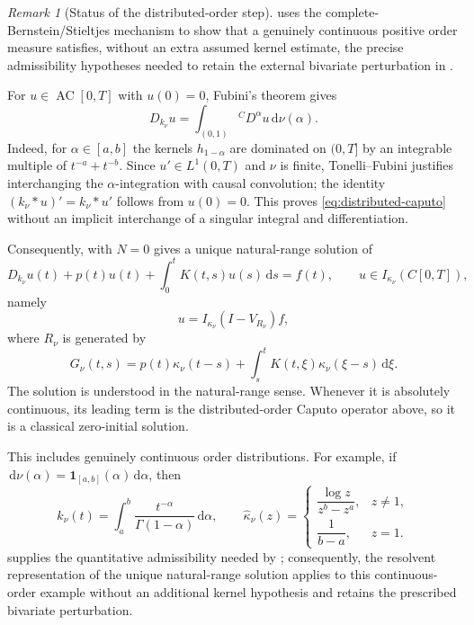 \documentclass[11pt]{article}
\numberwithin{equation}{section}
\theoremstyle{definition}
\theoremstyle{remark}
\newtheorem{remark}{Remark}
\newcommand{\one}{\mathbf 1}
\newcommand{\dd}{\,\mathrm d}
\newcommand{\AC}{\operatorname{AC}}
\begin{document}
\begin{remark}[Status of the distributed-order step]
 uses the complete-Bernstein/Stieltjes mechanism to show that a genuinely continuous positive order measure satisfies, without an extra assumed kernel estimate, the precise admissibility hypotheses needed to retain the external bivariate perturbation in .
\end{remark}

For $u\in\AC[0,T]$ with $u(0)=0$, Fubini's theorem gives
\begin{equation}
D_{k_\nu}u=\int_{(0,1)}{}^{C}\!D^\alpha u\dd\nu(\alpha).
\label{eq:distributed-caputo}
\end{equation}
Indeed, for $\alpha\in[a,b]$ the kernels $h_{1-\alpha}$ are dominated on $(0,T]$ by an integrable multiple of $t^{-a}+t^{-b}$. Since $u'\in L^1(0,T)$ and $\nu$ is finite, Tonelli--Fubini justifies interchanging the $\alpha$-integration with causal convolution; the identity $(k_\nu*u)'=k_\nu*u'$ follows from $u(0)=0$. This proves \eqref{eq:distributed-caputo} without an implicit interchange of a singular integral and differentiation.

Consequently,  with $N=0$ gives a unique natural-range solution of
\begin{equation}
D_{k_\nu}u(t)+p(t)u(t)+\int_0^tK(t,s)u(s)\dd s=f(t),
\qquad u\in I_{\kappa_\nu}(C[0,T]),
\end{equation}
namely
\begin{equation}
u=I_{\kappa_\nu}(I-V_{R_\nu})f,
\end{equation}
where $R_\nu$ is generated by
\begin{equation}
G_\nu(t,s)=p(t)\kappa_\nu(t-s)
+\int_s^tK(t,\xi)\kappa_\nu(\xi-s)\dd\xi.
\end{equation}
The solution is understood in the natural-range sense. Whenever it is absolutely continuous, its leading term is the distributed-order Caputo operator above, so it is a classical zero-initial solution.

This includes genuinely continuous order distributions. For example, if $\dd\nu(\alpha)=\one_{[a,b]}(\alpha)\dd\alpha$, then
\begin{equation*}
k_\nu(t)=\int_a^b\frac{t^{-\alpha}}{\Gamma(1-\alpha)}\dd\alpha,
\qquad
\widehat\kappa_\nu(z)=
\begin{cases}
\dfrac{\log z}{z^b-z^a},&z\ne1,\\[6pt]
\dfrac1{b-a},&z=1.
\end{cases}
\end{equation*}
 supplies the quantitative admissibility needed by ; consequently, the resolvent representation of the unique natural-range solution applies to this continuous-order example without an additional kernel hypothesis and retains the prescribed bivariate perturbation.
\end{document}
